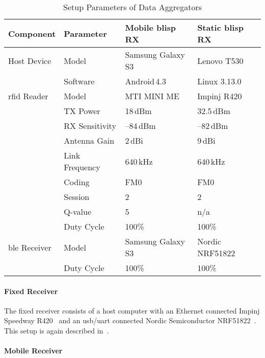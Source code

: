 \documentclass[conference,letterpaper,twoside,final,10pt]{IEEEtran}
\begin{document}
\begin{table}
	\centering
	\scriptsize
	\caption{Setup Parameters of Data Aggregators}
	\vspace{-2mm}
	\begin{tabularx}{\columnwidth}{llXX}
		\toprule
		Component 			& Parameter 		& Mobile \acs{blisp} RX	& Static \acs{blisp} RX \\
		\midrule
		Host Device 		& Model 			& Samsung Galaxy S3		& Lenovo T530 \\
							& Software		 	& Android\,4.3 			& Linux 3.13.0 \\
		\acs{rfid} Reader 	& Model 			& MTI MINI ME 			& Impinj R420 \\
							& TX Power 			& 18\,\si{dBm}			& 32.5\,\si{dBm} \\
							& RX Sensitivity	& --84\,\si{dBm} 		& --82\,\si{dBm} \\
							& Antenna Gain 		& 2\,\si{dBi}			& 9\,\si{dBi} \\
							& Link Frequency	& 640\,\si{\kilo\hertz} & 640\,\si{\kilo\hertz} \\
							& Coding 			& FM0 					& FM0 \\
							& Session 			& 2 					& 2 \\
							& Q-value 			& 5 					& n/a \\
							& Duty Cycle		& 100\% 				& 100\% \\
		\acs{ble} Receiver 	& Model 			& Samsung Galaxy S3		& Nordic NRF51822 \\
							& Duty Cycle		& 100\% 				& 100\% \\
		\bottomrule
	\end{tabularx}
	\label{tab:mobile_data_aggregator}
\end{table}

\paragraph{Fixed Receiver}
\label{sec:blisp/impinj}

The fixed receiver consists of a host computer with an Ethernet connected Impinj Speedway R420~\cite{impinj2014r420} and an \acs{usb}/\acs{uart} connected Nordic Semiconductor NRF51822~\cite{nordic2012nrf51822}.
This setup is again described in~.

\paragraph{Mobile Receiver}
\label{sec:blisp/minime}
\end{document}
